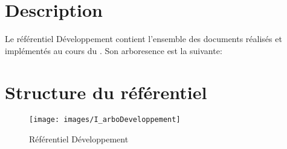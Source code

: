 \section{Description}

Le référentiel Développement contient l’ensemble des documents réalisés et implémentés au cours du \picCourt. Son arboresence est la suivante:

\section{Structure du référentiel}

\begin{figure}[ht]
         \begin{center}
         \texttt{[image: images/I\_arboDeveloppement]}
         \end{center}
         \caption{Référentiel Développement}
 \end{figure}
